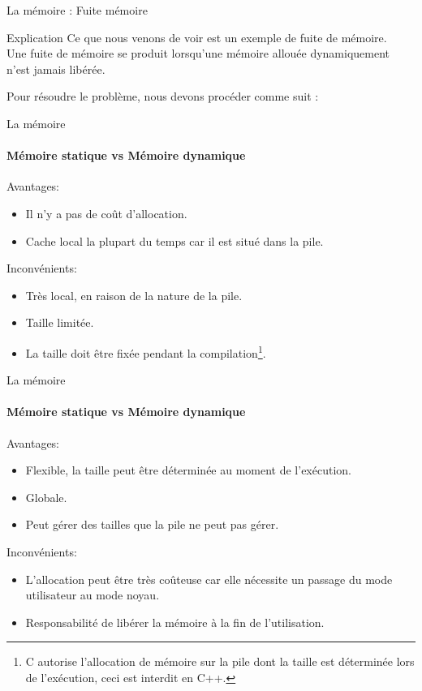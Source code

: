   	\begin{frame}{La mémoire : Fuite mémoire}
  		\begin{block}{Explication}
  			Ce que nous venons de voir est un exemple de \alert{fuite de mémoire}. \\
  			Une fuite de mémoire se produit lorsqu'une mémoire allouée dynamiquement n'est jamais libérée.
  		\end{block}
  		Pour résoudre le problème, nous devons procéder comme suit :
  		\leakExmplSolution
  	\end{frame}
  
  	\begin{frame}{La mémoire}
  		\framesubtitle{Mémoire statique vs Mémoire dynamique}
  		Avantages:
		\begin{itemize}
			\item Il n'y a pas de coût d'allocation.
			\item Cache local la plupart du temps car il est situé dans la pile.
		\end{itemize}
		Inconvénients:
		\begin{itemize}
			\item Très local, en raison de la nature de la pile.
			\item Taille limitée.
			\item La taille doit être fixée pendant la compilation\footnote[frame]{C autorise l'allocation de mémoire sur la pile dont la taille est déterminée lors de l'exécution, ceci est interdit en C++.}.
		\end{itemize}
  	\end{frame}
  
  	\begin{frame}{La mémoire}
  		\framesubtitle{Mémoire statique vs Mémoire dynamique}
  		Avantages:
  		\begin{itemize}
  			\item Flexible, la taille peut être déterminée au moment de l'exécution.
  			\item Globale.
  			\item Peut gérer des tailles que la pile ne peut pas gérer.
  		\end{itemize}
  		Inconvénients:
	  	\begin{itemize}
  			\item L'allocation peut être très coûteuse car elle nécessite un passage du mode utilisateur au mode noyau.
			\item Responsabilité de libérer la mémoire à la fin de l'utilisation.
	  	\end{itemize}
  	\end{frame}


